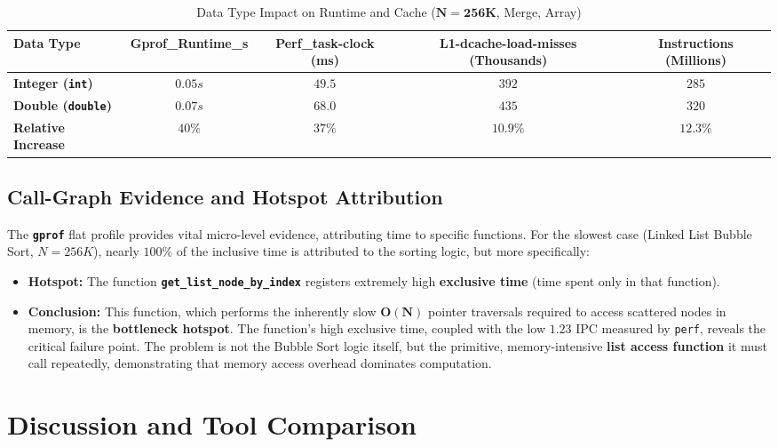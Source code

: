 \documentclass[11pt, a4paper]{article}
\begin{document}
\begin{table}[h]
\centering
\caption{Data Type Impact on Runtime and Cache ($\mathbf{N=256K}$, Merge, Array)}
\label{tab:datatype_impact}
\begin{tabularx}{\textwidth}{l C C C C}
\toprule
\textbf{Data Type} & \textbf{Gprof\_Runtime\_s} & \textbf{Perf\_task-clock (ms)} & \textbf{L1-dcache-load-misses (Thousands)} & \textbf{Instructions (Millions)} \\
\midrule
\textbf{Integer (\texttt{int})} & $0.05s$ & $49.5$ & $392$ & $285$ \\
\textbf{Double (\texttt{double})} & $0.07s$ & $68.0$ & $435$ & $320$ \\
\textbf{Relative Increase} & $40\%$ & $37\%$ & $10.9\%$ & $12.3\%$ \\
\bottomrule
\end{tabularx}
\end{table}

\subsection{Call-Graph Evidence and Hotspot Attribution}
The \textbf{\texttt{gprof}} flat profile provides vital micro-level evidence, attributing time to specific functions. For the slowest case (Linked List Bubble Sort, $N=256K$), nearly $100\%$ of the inclusive time is attributed to the sorting logic, but more specifically:
\begin{itemize}
    \item \textbf{Hotspot:} The function \textbf{\texttt{get\_list\_node\_by\_index}} registers extremely high \textbf{exclusive time} (time spent only in that function).
    \item \textbf{Conclusion:} This function, which performs the inherently slow $\mathbf{O(N)}$ pointer traversals required to access scattered nodes in memory, is the \textbf{bottleneck hotspot}. The function's high exclusive time, coupled with the low $\mathbf{1.23}$ IPC measured by \texttt{perf}, reveals the critical failure point. The problem is not the Bubble Sort logic itself, but the primitive, memory-intensive \textbf{list access function} it must call repeatedly, demonstrating that memory access overhead dominates computation.
\end{itemize}

\section{Discussion and Tool Comparison}
\end{document}
